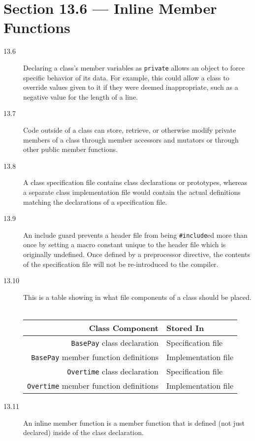 \documentclass[11pt]{article}
\begin{document}
\section*{Section 13.6 --- Inline Member Functions}
\begin{description}
    \item[13.6] Declaring a class's member variables as \lstinline{private} allows an object to force specific behavior of its data. For example, this could allow a class to override values given to it if they were deemed inappropriate, such as a negative value for the length of a line.
    \item[13.7] Code outside of a class can store, retrieve, or otherwise modify private members of a class through member accessors and mutators or through other public member functions.
    \item[13.8] A class specification file contains class declarations or prototypes, whereas a separate class implementation file would contain the actual definitions matching the declarations of a specification file.
    \item[13.9] An include guard prevents a header file from being \lstinline{#include}ed more than once by setting a macro constant unique to the header file which is originally undefined. Once defined by a preprocessor directive, the contents of the specification file will not be re-introduced to the compiler.
    \item[13.10] This is a table showing in what file components of a class should be placed. \\ \vspace*{1mm} \\
        \begin{tabular}{r || l}
            Class Component & Stored In \\
            \hline
            \lstinline{BasePay} class declaration & Specification file \\
            \lstinline{BasePay} member function definitions & Implementation file \\
            \lstinline{Overtime} class declaration & Specification file \\
            \lstinline{Overtime} member function definitions & Implementation file \\
        \end{tabular}
    \item[13.11] An inline member function is a member function that is defined (not just declared) inside of the class declaration.
\end{description}
\end{document}

